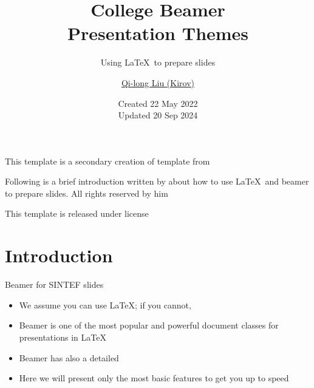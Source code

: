 \documentclass{beamer}
\title{College Beamer\\ Presentation Themes}
\subtitle{Using \LaTeX\ to prepare slides}
\author{\href{mailto:qilong-kirov.liu@connect.polyu.hk}{Qi-long Liu (Kirov)}}
\date{Created 22 May 2022\\Updated 20 Sep 2024}
\begin{document}
    \maketitle

    \begin{frame}
        This template is a secondary creation of  template from  \vspace{\baselineskip}

        Following is a brief introduction written by  about how to use \LaTeX\ and beamer to prepare slides. All rights reserved by him\vspace{\baselineskip}

        This template is released under  license
    \end{frame}

    \section{Introduction}

    \begin{frame}{Beamer for SINTEF slides}{\thesection \, \secname}
        \begin{itemize}
            \item We assume you can use \LaTeX; if you cannot, 
            \item Beamer is one of the most popular and powerful document classes for presentations in \LaTeX
            \item Beamer has also a detailed 
            \item Here we will present only the most basic features to get you up to speed
        \end{itemize}
    \end{frame}
\end{document}
